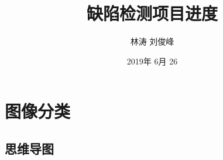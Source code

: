 \documentclass[UTF8,a4paper]{ctexrep}
\begin{document}
\hypersetup{CJKbookmarks=true}
\title{缺陷检测项目进度}
\author{林涛 刘俊峰}
\date{2019年 6月 26}
\maketitle



\chapter{图像分类}
\section{思维导图}
\end{document}
